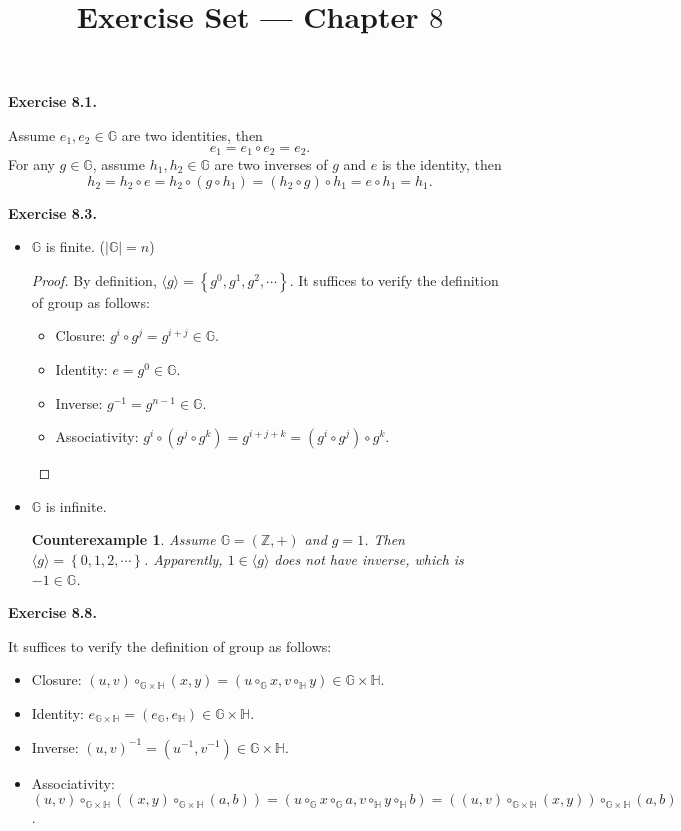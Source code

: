 \documentclass[a4paper]{article}
\title{Exercise Set --- Chapter $8$}
\date{}
\newtheorem*{proof}{Proof}
\newtheorem*{counterexample}{Counterexample}
\newenvironment{exercise}[1]{
	\par
	\noindent\textbf{Exercise #1.}\quad
}{
	\par
	\bigskip
}
\newcommand{\cbra}[1]{\left\{ #1 \right\}}
\newcommand{\Gset}{\mathbb{G}}
\newcommand{\Zset}{\mathbb{Z}}
\newcommand{\Hset}{\mathbb{H}}
\begin{document}
\maketitle

\begin{exercise}{8.1} 
    Assume $e_1,e_2\in\Gset$ are two identities, then
    $$
    e_1=e_1\circ e_2=e_2.
    $$
    For any $g\in\Gset$, assume $h_1,h_2\in\Gset$ are two inverses of $g$ and $e$ is the identity, then
    $$
    h_2=h_2\circ e=h_2\circ(g\circ h_1)=(h_2\circ g)\circ h_1=e\circ h_1=h_1.
    $$
\end{exercise}

\begin{exercise}{8.3}
\begin{itemize}
    \item $\Gset$ is finite. ($|\Gset|=n$)
        \begin{proof}
            By definition, $\langle g\rangle=\cbra{g^0,g^1,g^2,\cdots}$. 
            It suffices to verify the definition of group as follows:
            \begin{itemize}
                \item Closure: $g^i\circ g^j=g^{i+j}\in\Gset$.
                \item Identity: $e=g^0\in\Gset$.
                \item Inverse: $g^{-1}=g^{n-1}\in\Gset$.
                \item Associativity: $g^i\circ(g^j\circ g^k)=g^{i+j+k}=(g^i\circ g^j)\circ g^k$.
            \end{itemize}
        \end{proof}
    \item $\Gset$ is infinite.
        \begin{counterexample}
            Assume $\Gset=(\Zset,+)$ and $g=1$. Then $\langle g\rangle=\cbra{0,1,2,\cdots}$.
            Apparently, $1\in\langle g\rangle$ does not have inverse, which is $-1\in\Gset$.
        \end{counterexample}
\end{itemize}
\end{exercise}

\begin{exercise}{8.8}
    It suffices to verify the definition of group as follows:
    \begin{itemize}
        \item Closure: $(u,v)\circ_{\Gset\times\Hset}(x,y)=(u\circ_\Gset x,v\circ_\Hset y)\in\Gset\times\Hset$.
        \item Identity: $e_{\Gset\times\Hset}=(e_\Gset,e_\Hset)\in\Gset\times\Hset$.
        \item Inverse: $(u,v)^{-1}=(u^{-1},v^{-1})\in\Gset\times\Hset$.
        \item Associativity: $(u,v)\circ_{\Gset\times\Hset}((x,y)\circ_{\Gset\times\Hset} (a,b))=
            (u\circ_\Gset x\circ_\Gset a,v\circ_\Hset y\circ_\Hset b)=
            ((u,v)\circ_{\Gset\times\Hset}(x,y))\circ_{\Gset\times\Hset}(a,b)$.
    \end{itemize}
\end{exercise}
\end{document}
